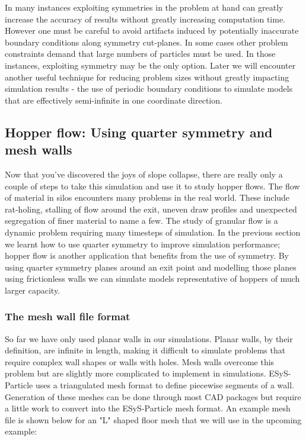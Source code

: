 In many instances exploiting symmetries in the problem at hand can greatly increase the accuracy of results without greatly increasing computation time. However one must be careful to avoid artifacts induced by potentially inaccurate boundary conditions along symmetry cut-planes. In some cases other problem constraints demand that large numbers of particles must be used. In those instances, exploiting symmetry may be the only option. Later we will encounter another useful technique for reducing problem sizes without greatly impacting simulation results - the use of periodic boundary conditions to simulate models that are effectively semi-infinite in one coordinate direction. 

\subsection{Hopper flow: Using quarter symmetry and mesh walls}

Now that you've discovered the joys of slope collapse, there are really only a couple of steps to take this simulation and use it to study hopper flows. The flow of material in silos encounters many problems in the real world. These include rat-holing, stalling of flow around the exit, uneven draw profiles and unexpected segregation of finer material to name a few. The study of granular flow is a dynamic problem requiring many timesteps of simulation. In the previous section we learnt how to use quarter symmetry to improve simulation performance; hopper flow is another application that benefits from the use of symmetry. By using quarter symmetry planes around an exit point and modelling those planes using frictionless walls we can simulate models representative of hoppers of much larger capacity.

\subsubsection{The mesh wall file format}

So far we have only used planar walls in our simulations. Planar walls, by their definition, are infinite in length, making it difficult to simulate problems that require complex wall shapes or walls with holes. Mesh walls overcome this problem but are slightly more complicated to implement in simulations. ESyS-Particle uses a triangulated mesh format to define piecewise segments of a wall. Generation of these meshes can be done through most CAD packages but require a little work to convert into the ESyS-Particle mesh format. An example mesh file is shown below for an "L" shaped floor mesh that we will use in the upcoming example:

